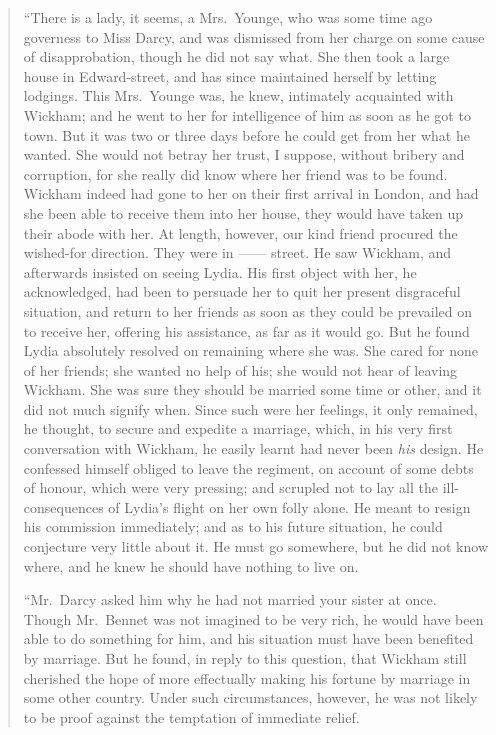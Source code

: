 \documentclass[12pt,english]{book}
\begin{document}
\begin{quotation}
{}``There is a lady, it seems, a Mrs.\ Younge, who was some time
ago governess to Miss Darcy, and was dismissed from her charge on
some cause of disapprobation, though he did not say what. She then
took a large house in Edward-street, and has since maintained herself
by letting lodgings. This Mrs.\ Younge was, he knew, intimately acquainted
with Wickham; and he went to her for intelligence of him as soon as
he got to town. But it was two or three days before he could get from
her what he wanted. She would not betray her trust, I suppose, without
bribery and corruption, for she really did know where her friend was
to be found. Wickham indeed had gone to her on their first arrival
in London, and had she been able to receive them into her house, they
would have taken up their abode with her. At length, however, our
kind friend procured the wished-for direction. They were in \mbox{------}
street. He saw Wickham, and afterwards insisted on seeing Lydia. His
first object with her, he acknowledged, had been to persuade her to
quit her present disgraceful situation, and return to her friends
as soon as they could be prevailed on to receive her, offering his
assistance, as far as it would go. But he found Lydia absolutely resolved
on remaining where she was. She cared for none of her friends; she
wanted no help of his; she would not hear of leaving Wickham. She
was sure they should be married some time or other, and it did not
much signify when. Since such were her feelings, it only remained,
he thought, to secure and expedite a marriage, which, in his very
first conversation with Wickham, he easily learnt had never been \textit{his}
design. He confessed himself obliged to leave the regiment, on account
of some debts of honour, which were very pressing; and scrupled not
to lay all the ill-consequences of Lydia's flight on her own folly
alone. He meant to resign his commission immediately; and as to his
future situation, he could conjecture very little about it. He must
go somewhere, but he did not know where, and he knew he should have
nothing to live on.

{}``Mr.\ Darcy asked him why he had not married your sister at once.
Though Mr.\ Bennet was not imagined to be very rich, he would have
been able to do something for him, and his situation must have been
benefited by marriage. But he found, in reply to this question, that
Wickham still cherished the hope of more effectually making his fortune
by marriage in some other country. Under such circumstances, however,
he was not likely to be proof against the temptation of immediate
relief.


\end{quotation}
\end{document}
